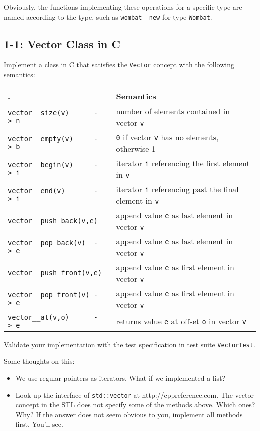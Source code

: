 \documentclass[]{article}
\providecommand{\tightlist}{%
  \setlength{\itemsep}{0pt}\setlength{\parskip}{0pt}}
\begin{document}
Obviously, the functions implementing these operations for a specific
type are named according to the type, such as \texttt{wombat\_\_new} for
type \texttt{Wombat}.

\subsection{1-1: Vector Class in C}\label{vector-class-in-c}

Implement a class in C that satisfies the \texttt{Vector} concept with
the following semantics:

\begin{longtable}[c]{@{}ll@{}}
\toprule
. & Semantics \tabularnewline
\midrule
\endhead
\texttt{vector\_\_size(v)\ \ \ \ \ \ -\textgreater{}\ n} & number of
elements contained in vector \texttt{v}\tabularnewline
\texttt{vector\_\_empty(v)\ \ \ \ \ -\textgreater{}\ b} & \texttt{0} if
vector \texttt{v} has no elements, otherwise 1\tabularnewline
\texttt{vector\_\_begin(v)\ \ \ \ \ -\textgreater{}\ i} & iterator
\texttt{i} referencing the first element in \texttt{v}\tabularnewline
\texttt{vector\_\_end(v)\ \ \ \ \ \ \ -\textgreater{}\ i} & iterator
\texttt{i} referencing past the final element in
\texttt{v}\tabularnewline
\texttt{vector\_\_push\_back(v,e)} & append value \texttt{e} as last
element in vector \texttt{v}\tabularnewline
\texttt{vector\_\_pop\_back(v)\ \ -\textgreater{}\ e} & append value
\texttt{e} as last element in vector \texttt{v}\tabularnewline
\texttt{vector\_\_push\_front(v,e)} & append value \texttt{e} as first
element in vector \texttt{v}\tabularnewline
\texttt{vector\_\_pop\_front(v)\ -\textgreater{}\ e} & append value
\texttt{e} as first element in vector \texttt{v}\tabularnewline
\texttt{vector\_\_at(v,o)\ \ \ \ \ \ -\textgreater{}\ e} & returns value
\texttt{e} at offset \texttt{o} in vector \texttt{v}\tabularnewline
\bottomrule
\end{longtable}

Validate your implementation with the test specification in test suite
\texttt{VectorTest}.

Some thoughts on this:

\begin{itemize}
\tightlist
\item
  We use regular pointers as iterators. What if we implemented a list?
\item
  Look up the interface of \texttt{std::vector} at
  http://cppreference.com. The vector concept in the STL does not
  specify some of the methods above. Which ones? Why? If the answer does
  not seem obvious to you, implement all methods first. You'll see.
\end{itemize}
\end{document}
